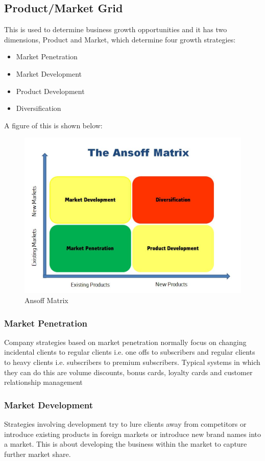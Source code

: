 \documentclass[a4paper]{article}
\begin{document}
{\subsection{Product/Market Grid}
This is used to determine business growth opportunities and it has two dimensions, Product and Market, which determine four growth strategies:

\begin{itemize}
	\item Market Penetration
	\item Market Development
	\item Product Development
	\item Diversification
\end{itemize}
A figure of this is shown below:
\begin{figure}[h]
	\centering
\includegraphics[scale=.25]{ansoff-matrix}
	\caption{Ansoff Matrix}
	\label{fig:ansoff-matrix}
\end{figure}

\subsubsection{Market Penetration}
Company strategies based on market penetration normally focus on changing incidental clients to regular clients i.e. one offs to subscribers and regular clients to heavy clients i.e. subscribers to premium subscribers. Typical systems in which they can do this are volume discounts, bonus cards, loyalty cards and customer relationship management

\subsubsection{Market Development}
Strategies involving development try to lure clients away from competitors or introduce existing products in foreign markets or introduce new brand names into a market. This is about developing the business within the market to capture further market share.

}
\end{document}
